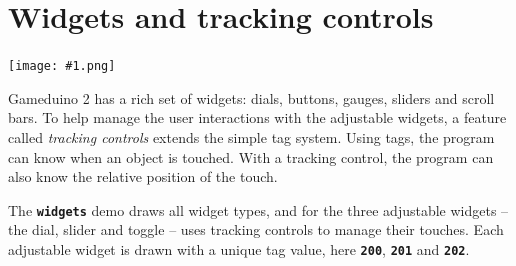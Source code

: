 \documentclass[10pt]{book}
\newcommand{\gdtwo}{Gameduino 2 }
\newcommand{\png}[1]{
\begin{center}
\texttt{[image: \#1.png]}
\end{center}
}
\newcommand{\mach}[1]{\texttt{\textbf{#1}}}
\begin{document}
\section{Widgets and tracking controls}
\label{widgets}

\png{widgets3d}

\gdtwo has a rich set of widgets: dials, buttons, gauges, sliders and scroll bars.
To help manage the user interactions with the adjustable widgets, a feature called \textit{tracking controls}
extends the simple tag system.
Using tags, the program can know when an object is touched.
With a tracking control, the program can also know the relative position of the touch.

The \mach{widgets} demo draws all widget types, and
for the three adjustable widgets -- the dial, slider and toggle -- uses tracking controls to manage their touches.
Each adjustable widget is drawn with a unique tag value, here
\mach{200},
\mach{201} and
\mach{202}.

\vspace{10pt}

\end{document}
